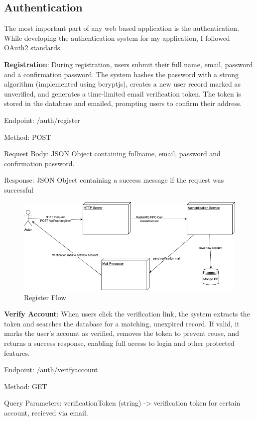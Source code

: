 \subsection{Authentication}
The most important part of any web based application is the authentication. While developing the authentication system for my application, I followed OAuth2\cite{OAUTH2} standards. 

\textbf{Registration}: During registration, users submit their full name, email, password and a confirmation password. The system hashes the password with a strong algorithm (implemented using bcryptjs), creates a new user record marked as unverified, and generates a time-limited email verification token. The token is stored in the database and emailed, prompting users to confirm their address.

Endpoint: /auth/register

Method: POST

Request Body: JSON\cite{JSON} Object containing fullname, email, password and confirmation password.

Response: JSON Object containing a success message if the request was successful

\begin{figure}[H]
  \centering
  \includegraphics[width=1\linewidth]{licenta-register.drawio.png}
  \caption*{Register Flow}
  \label{fig:register-flow}
\end{figure}

\textbf{Verify Account}: When users click the verification link, the system extracts the token and searches the database for a matching, unexpired record. If valid, it marks the user’s account as verified, removes the token to prevent reuse, and returns a success response, enabling full access to login and other protected features.

Endpoint: /auth/verifyaccount

Method: GET

Query Parameters: verificationToken (string) -> verification token for certain account, recieved via email.

